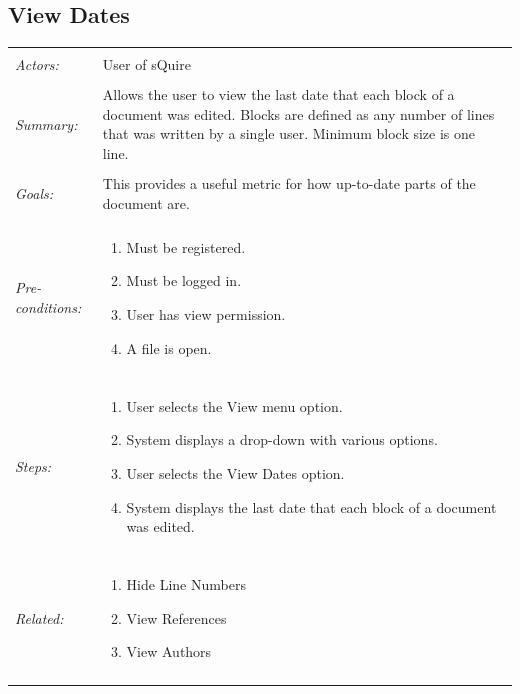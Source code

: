 \documentclass[11pt]{report}
\begin{document}
\subsection{View Dates}
\begin{tabular}{ p{2cm} p{12cm} }
\hline \\
	\textit{Actors:} & User of sQuire \\
	\\
	\textit{Summary:} & Allows the user to view the last date that each block of a document was edited. Blocks are defined as any number of lines that was written by a single user. Minimum block size is one line. \\
	\\
	\textit{Goals:} & This provides a useful metric for how up-to-date parts of the document are. \\
	\\
	\textit{Pre-conditions:} & \begin{enumerate}
		\item Must be registered.
		\item Must be logged in.
		\item User has view permission.
		\item A file is open.
	\end{enumerate} \\
	\\
	\textit{Steps:} & \begin{enumerate}
		\item User selects the View menu option.
		\item System displays a drop-down with various options.
		\item User selects the View Dates option.
		\item System displays the last date that each block of a document was edited.
	\end{enumerate} \\
	\\
	\textit{Related:} & \begin{enumerate}
		\item Hide Line Numbers
		\item View References
		\item View Authors
	\end{enumerate} \\
	\\
\hline
\end{tabular}
\newpage
\end{document}
